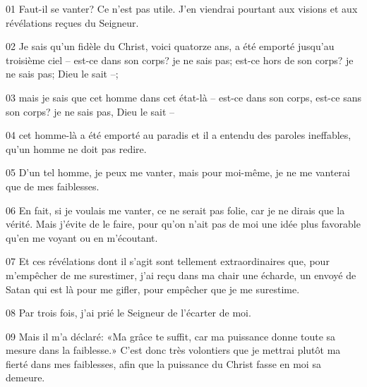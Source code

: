 01 Faut-il se vanter? Ce n’est pas utile. J’en viendrai pourtant aux visions et aux révélations reçues du Seigneur.

02 Je sais qu’un fidèle du Christ, voici quatorze ans, a été emporté jusqu’au troisième ciel – est-ce dans son corps? je ne sais pas; est-ce hors de son corps? je ne sais pas; Dieu le sait –;

03 mais je sais que cet homme dans cet état-là – est-ce dans son corps, est-ce sans son corps? je ne sais pas, Dieu le sait –

04 cet homme-là a été emporté au paradis et il a entendu des paroles ineffables, qu’un homme ne doit pas redire.

05 D’un tel homme, je peux me vanter, mais pour moi-même, je ne me vanterai que de mes faiblesses.

06 En fait, si je voulais me vanter, ce ne serait pas folie, car je ne dirais que la vérité. Mais j’évite de le faire, pour qu’on n’ait pas de moi une idée plus favorable qu’en me voyant ou en m’écoutant.

07 Et ces révélations dont il s’agit sont tellement extraordinaires que, pour m’empêcher de me surestimer, j’ai reçu dans ma chair une écharde, un envoyé de Satan qui est là pour me gifler, pour empêcher que je me surestime.

08 Par trois fois, j’ai prié le Seigneur de l’écarter de moi.

09 Mais il m’a déclaré: «Ma grâce te suffit, car ma puissance donne toute sa mesure dans la faiblesse.» C’est donc très volontiers que je mettrai plutôt ma fierté dans mes faiblesses, afin que la puissance du Christ fasse en moi sa demeure.